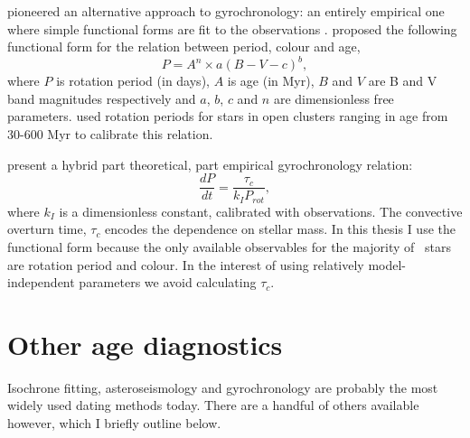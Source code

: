 \citet{Barnes2003} pioneered an alternative approach to gyrochronology: an
entirely empirical one where simple functional forms are fit to the
observations \citep[\eg][]{Barnes2007, Mamajek2008}.
\citet{Barnes2003} proposed the following functional form for the relation
between period, colour and age,
\begin{equation}
P = A^n \times a(B-V-c)^b,
\end{equation}
\label{eq:Barnes2007_2}
where $P$ is rotation period (in days),
$A$ is age (in Myr), $B$ and $V$ are B and V band magnitudes respectively and
$a$, $b$, $c$ and $n$ are dimensionless free parameters.
\citet{Barnes2007} used rotation periods for stars in open clusters ranging in
age from 30-600 Myr to calibrate this relation.

\citet{Barnes2010b} present a hybrid part theoretical, part empirical
gyrochronology relation:
\begin{equation}
\frac{dP}{dt} = \frac{\tau_c}{k_IP_{rot}},
\end{equation}
where $k_I$ is a dimensionless constant, calibrated with observations.
The convective overturn time, $\tau_c$ encodes the dependence on stellar mass.
In this thesis I use the \citet{Barnes2003} functional form because the only
available observables for the majority of \kepler\ stars are rotation period
and colour.
In the interest of using relatively model-independent parameters we avoid
calculating $\tau_c$.

\section{Other age diagnostics}
\label{sec:activity}

Isochrone fitting, asteroseismology and gyrochronology are probably the most
widely used dating methods today.
There are a handful of others available however, which I briefly outline
below.

